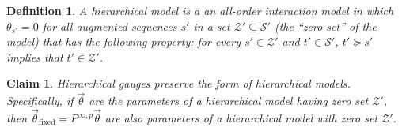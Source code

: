 \documentclass{article}
\numberwithin{myclaim}{section}
\newcommand{\myfixed}{\mathrm{fixed}}
\newtheorem{claim}{Claim}
\newtheorem{definition}{Definition}
\begin{document}
\begin{definition}
A hierarchical model is a an all-order interaction model in which $\theta_{s'} = 0$ for all augmented sequences $s'$ in a set $\mathcal{Z}'\subseteq \mathcal{S}'$ (the ``zero set'' of the model) that has the following property: for every $s' \in \mathcal{Z}'$ and $t' \in \mathcal{S}'$, $t' \succeq s'$ implies that $t' \in \mathcal{Z}'$.    
\end{definition}

\begin{claim} \label{claim:generalized_zero_sum_gauges_preserve_hierarchical_models}
Hierarchical gauges preserve the form of hierarchical models. Specifically, if $\vec{\theta}$ are the parameters of a hierarchical model having zero set $\mathcal{Z}'$, then $\vec{\theta}_\myfixed = P^{\infty,p} \vec{\theta}$ are also parameters of a hierarchical model with zero set $\mathcal{Z}'$. 
\end{claim}
\end{document}

